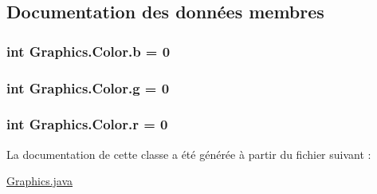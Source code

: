 \subsection{Documentation des données membres}
\hypertarget{classGraphics_1_1Color_a2b25de212325802068d3f888c569f09f}{
\subsubsection[{b}]{\setlength{\rightskip}{0pt plus 5cm}int Graphics.\-Color.\-b = 0\hspace{0.3cm}{\ttfamily [package]}}}\label{classGraphics_1_1Color_a2b25de212325802068d3f888c569f09f}
\hypertarget{classGraphics_1_1Color_a69ddf3728f1981950e28a5172bf48fed}{
\subsubsection[{g}]{\setlength{\rightskip}{0pt plus 5cm}int Graphics.\-Color.\-g = 0\hspace{0.3cm}{\ttfamily [package]}}}\label{classGraphics_1_1Color_a69ddf3728f1981950e28a5172bf48fed}
\hypertarget{classGraphics_1_1Color_a6e040c14375b2701c82e72a3f2fbc7ec}{
\subsubsection[{r}]{\setlength{\rightskip}{0pt plus 5cm}int Graphics.\-Color.\-r = 0\hspace{0.3cm}{\ttfamily [package]}}}\label{classGraphics_1_1Color_a6e040c14375b2701c82e72a3f2fbc7ec}


La documentation de cette classe a été générée à partir du fichier suivant \-:\begin{DoxyCompactItemize}
\item 
\hyperlink{Graphics_8java}{Graphics.\-java}\end{DoxyCompactItemize}

